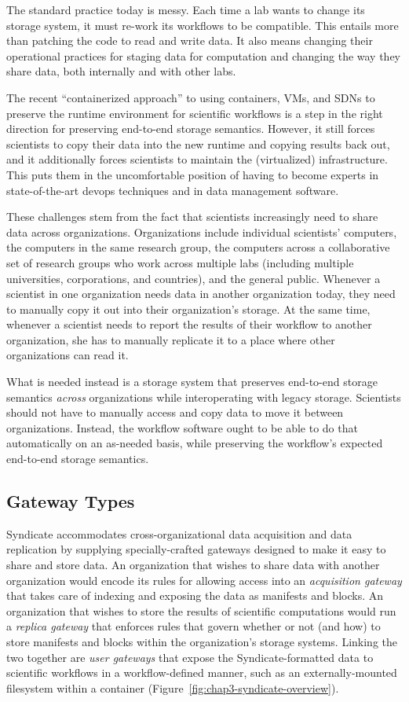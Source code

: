 The standard practice today is messy.  Each time a lab wants to change its
storage system, it must re-work its workflows to be compatible.  This entails
more than patching the code to read and write data.  It also means changing their
operational practices for staging data for computation and changing the way they
share data, both internally and with other labs.

The recent ``containerized approach'' to using containers, VMs, and
SDNs to preserve the runtime environment for scientific workflows
is a step in the right direction for preserving end-to-end storage semantics.
However, it still forces scientists to copy their data into the new
runtime and copying results back out, and it additionally forces scientists to
maintain the (virtualized) infrastructure.  This puts them in the uncomfortable
position of having to become experts in state-of-the-art devops techniques and
in data management software.

These challenges stem from the fact that scientists increasingly need to share
data across organizations.  Organizations include individual
scientists' computers, the computers in the same research group, the computers
across a collaborative set of research groups who
work across multiple labs (including multiple universities, corporations, and
countries), and the general public.  Whenever a scientist in one organization
needs data in another organization today, they need to manually copy it out into their
organization's storage.  At the same time, whenever a scientist needs to report the results
of their workflow to another organization, she has to manually replicate it to a place
where other organizations can read it.

What is needed instead is a storage system that preserves end-to-end storage
semantics \emph{across} organizations while interoperating with legacy storage.
Scientists should not have to manually access and copy data to move it between
organizations.  Instead, the workflow
software ought to be able to do that automatically on an as-needed basis,
while preserving the workflow's expected end-to-end storage semantics.

\subsection{Gateway Types}

Syndicate accommodates cross-organizational data acquisition and
data replication by supplying specially-crafted gateways designed to make it
easy to share and store data.  An organization that wishes to share data with
another organization would encode its rules for allowing access into an
\emph{acquisition gateway} that takes care of indexing and exposing the data as
manifests and blocks.  An organization that wishes to store the results of
scientific computations would run a \emph{replica gateway} that enforces rules
that govern whether or not (and how) to store manifests and blocks within the
organization's storage systems.  Linking the two together are \emph{user
gateways} that expose the Syndicate-formatted data to scientific workflows in a
workflow-defined manner, such as an externally-mounted filesystem within a
container (Figure~\ref{fig:chap3-syndicate-overview}).

